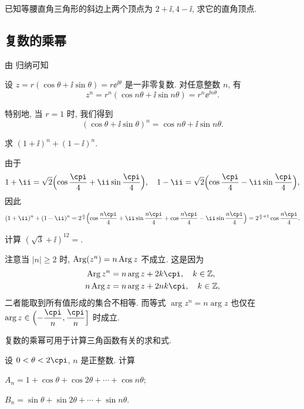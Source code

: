 \begin{exercise}
  已知等腰直角三角形的斜边上两个顶点为 $2+\ii,4-\ii$, 求它的直角顶点.
\end{exercise}


\subsection{复数的乘幂}

由 归纳可知
\begin{theorem}
  设 $z=r(\cos\theta+\ii\sin\theta)=r\ee^{\ii\theta}$ 是一非零复数.
  对任意整数 $n$, 有
  \[
    z^n=r^n(\cos{n\theta}+\ii\sin{n\theta})
    =r^n\ee^{\ii n\theta}.
  \]
\end{theorem}
特别地, 当 $r=1$ 时, 我们得到
\[
  (\cos\theta+\ii\sin\theta)^n=\cos{n\theta}+\ii\sin{n\theta}.
\]

\begin{example}
  求 $(1+\ii)^n+(1-\ii)^n$.
\end{example}

\begin{solution}
  由于
  \[
    1+\ii=\sqrt2\Bigl(\cos\frac\cpi4+\ii\sin\frac\cpi4\Bigr),\quad
    1-\ii=\sqrt2\Bigl(\cos\frac\cpi4-\ii\sin\frac\cpi4\Bigr),
  \]
  因此
  \[
     (1+\ii)^n+(1-\ii)^n
    =2^{\frac n2}\Bigl(\cos\frac{n\cpi}4+\ii\sin\frac{n\cpi}4 
      +\cos\frac{n\cpi}4-\ii\sin\frac{n\cpi}4\Bigr)
    =2^{\frac n2+1}\cos\frac{n\cpi}4.
  \]
\end{solution}

\begin{exercise}
  计算 $(\sqrt3+\ii)^{12}=$\fillblank{}.
\end{exercise}

注意当 $|n|\ge 2$ 时, \alert{$\operatorname{Arg}(z^n)=n\operatorname{Arg} z$ 不成立}.
这是因为
\begin{align*}
  \Arg z^n&=n\arg z+2k\cpi,\quad k\in\BZ,\\
  n\Arg z&=n\arg z+2nk\cpi,\quad k\in\BZ,
\end{align*}
二者能取到所有值形成的集合不相等.
而等式 $\arg z^n=n\arg z$ 也仅在 $\arg z\in\Bigl(-\dfrac{\cpi}n,\dfrac\cpi n\Bigr]$ 时成立.

复数的乘幂可用于计算三角函数有关的求和式.

\begin{example}
  设 $0<\theta<2\cpi$, $n$ 是正整数. 计算
  \begin{subexample}
    \item $A_n=1+\cos\theta+\cos{2\theta}+\cdots+\cos{n\theta}$;
    \item $B_n=\sin\theta+\sin{2\theta}+\cdots+\sin{n\theta}$.
  \end{subexample}
\end{example}

